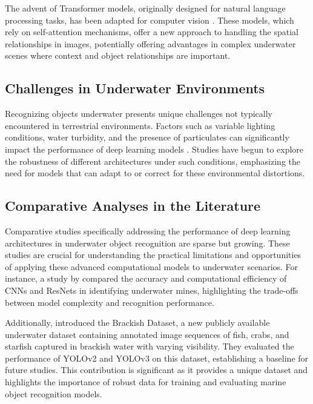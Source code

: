 The advent of Transformer models, originally designed for natural
language processing tasks, has been adapted for computer
vision \parencite{hanSurveyVisionTransformer2023}.
These models, which rely on self-attention mechanisms, offer a new
approach to handling the spatial relationships in images,
potentially offering advantages in complex underwater scenes where context
and object relationships are important.

\subsection{Challenges in Underwater Environments}
Recognizing objects underwater presents unique challenges not typically
encountered in terrestrial environments.
Factors such as variable lighting conditions, water turbidity, and the
presence of particulates can significantly impact the performance of deep
learning models \parencite{liUnderwaterImageEnhancement2020}.
Studies have begun to explore the robustness of different architectures under
such conditions, emphasizing the need for models that can adapt to or correct
for these environmental distortions.

\subsection{Comparative Analyses in the Literature}
Comparative studies specifically addressing the performance of deep learning
architectures in underwater object recognition are sparse but growing.
These studies are crucial for understanding the practical limitations and
opportunities of applying these advanced computational models to underwater
scenarios.
For instance, a study by \Textcite{tengUnderwaterTargetRecognition2020}
compared the accuracy and computational efficiency of CNNs
and ResNets in identifying underwater mines,
highlighting the trade-offs between model complexity and recognition
performance.

Additionally, \Textcite{pedersenDetectionMarineAnimals2019} introduced the Brackish Dataset,
a new publicly available underwater dataset containing annotated image sequences of fish,
crabs, and starfish captured in brackish water with varying visibility.
They evaluated the performance of YOLOv2 and YOLOv3 on this dataset,
establishing a baseline for future studies. 
This contribution is significant as it provides a unique dataset and highlights
the importance of robust data for training and evaluating marine object recognition models.

